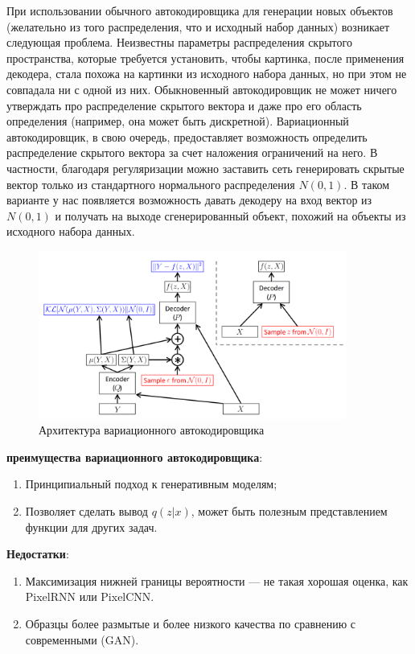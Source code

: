 При использовании обычного автокодировщика для генерации новых объектов (желательно из того распределения, что и исходный набор данных) возникает следующая проблема. Неизвестны параметры распределения скрытого пространства, которые требуется установить, чтобы картинка, после применения декодера, стала похожа на картинки из исходного набора данных, но при этом не совпадала ни с одной из них. Обыкновенный автокодировщик не может ничего утверждать про распределение скрытого вектора и даже про его область определения (например, она может быть дискретной).\newline
Вариационный автокодировщик, в свою очередь, предоставляет возможность определить распределение скрытого вектора за счет наложения ограничений на него. В частности, благодаря регуляризации можно заставить сеть генерировать скрытые вектор только из стандартного нормального распределения $N(0, 1)$.\newline
В таком варианте у нас появляется возможность давать декодеру на вход вектор из $N(0, 1)$ и получать на выходе сгенерированный объект, похожий на объекты из исходного набора данных.

\begin{figure}[h]
    \centering
    \includegraphics[width=0.9\textwidth]{images/vae.png}
    \caption{Архитектура вариационного автокодировщика}
\end{figure}

\textbf{преимущества вариационного автокодировщика}:
\begin{enumerate}
    \item Принципиальный подход к генеративным моделям;
    \item Позволяет сделать вывод $q(z|x)$, может быть полезным представлением функции для других задач.
\end{enumerate}

\textbf{Недостатки}:
\begin{enumerate}
    \item Максимизация нижней границы вероятности --- не такая хорошая оценка, как PixelRNN или PixelCNN.
    \item Образцы более размытые и более низкого качества по сравнению с современными (GAN).
\end{enumerate}

